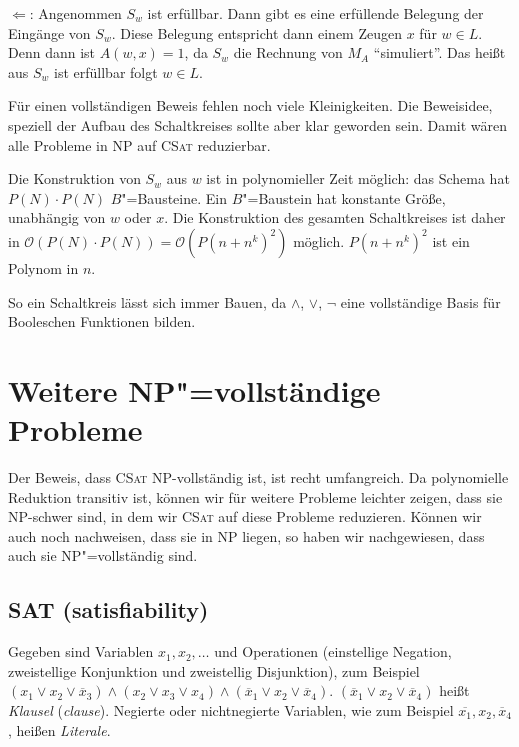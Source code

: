 \begin{Bew}
  \glq$\Leftarrow$\grq: Angenommen $S_w$ ist erfüllbar. Dann gibt es eine erfüllende Belegung der Eingänge von $S_w$. Diese Belegung entspricht dann einem Zeugen $x$ für $w \in L$. Denn dann ist $A(w,x) =1$, da $S_w$ die Rechnung von $M_A$ "`simuliert"'. Das heißt aus $S_w$ ist erfüllbar folgt $w \in L$.
  
  Für einen vollständigen Beweis fehlen noch viele Kleinigkeiten. Die Beweisidee, speziell der Aufbau des Schaltkreises sollte aber klar geworden sein.  Damit wären alle Probleme in \textsf{NP} auf \textsc{CSat} reduzierbar.
  
  Die Konstruktion von $S_w$ aus $w$ ist in polynomieller Zeit möglich: das Schema hat $P(N) \cdot P(N)$ $B$"=Bausteine. Ein $B$"=Baustein hat konstante Größe, unabhängig von $w$ oder $x$. Die Konstruktion des gesamten Schaltkreises ist daher in $\mathcal{O}(P(N) \cdot P(N)) = \mathcal{O}(P(n+n^k)^2)$ möglich. $P(n+n^k)^2$ ist ein Polynom in $n$.
\end{Bew}

\begin{Anm}
  \hspace{\parindent}So ein Schaltkreis lässt sich immer Bauen, da $\wedge$, $\vee$, $\neg$ eine vollständige Basis für Booleschen Funktionen bilden.
\end{Anm}

\section{Weitere NP"=vollständige Probleme}
Der Beweis, dass \textsc{CSat} \textsf{NP}-vollständig ist, ist recht umfangreich. Da polynomielle Reduktion transitiv ist, können wir für weitere Probleme leichter zeigen, dass sie \textsf{NP}-schwer sind, in dem wir \textsc{CSat} auf diese Probleme reduzieren. Können wir auch noch nachweisen, dass sie in \textsf{NP} liegen, so haben wir nachgewiesen, dass auch sie \textsf{NP}"=vollständig sind.

\subsection{SAT (satisfiability)}
Gegeben sind Variablen $x_1, x_2, \ldots$ und Operationen (einstellige Negation, zweistellige Konjunktion und zweistellig Disjunktion), zum Beispiel $(x_1 \vee x_2 \vee \overline{x}_3)\wedge(x_2 \vee x_3 \vee x_4) \wedge (\overline{x}_1 \vee x_2 \vee \overline{x}_4)$. $(\overline{x}_1 \vee x_2 \vee \overline{x}_4)$ heißt \textit{Klausel} (\textit{clause}). Negierte oder nichtnegierte Variablen, wie zum Beispiel $\overline{x_1}, x_2, \overline{x}_4$, heißen \textit{Literale}.

